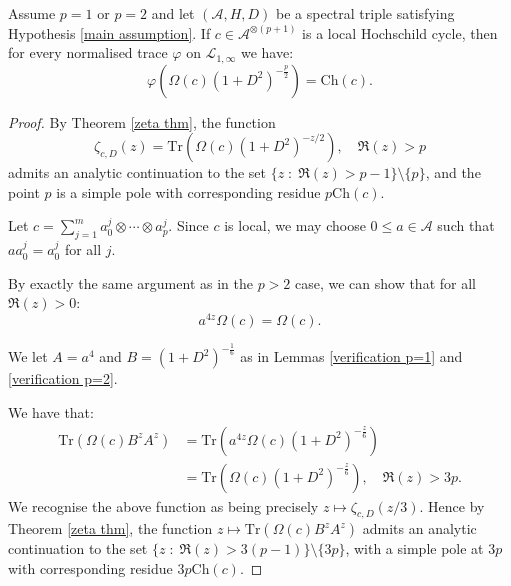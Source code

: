     \begin{thm*}
        Assume $p =1$ or $p=2$ and let $(\mathcal{A},H,D)$ be a spectral triple satisfying Hypothesis \ref{main assumption}. If $c\in\mathcal{A}^{\otimes (p+1)}$ is a local Hochschild cycle, then
        for every normalised trace $\varphi$ on $\mathcal{L}_{1,\infty}$ we have:
        \begin{equation*}
            \varphi(\Omega(c)(1+D^2)^{-\frac{p}{2}})=\mathrm{Ch}(c).
        \end{equation*}
    \end{thm*}
    \begin{proof}
        By Theorem \ref{zeta thm}, the function
        \begin{equation*}
            \zeta_{c,D}(z) = \mathrm{Tr}(\Omega(c)(1+D^2)^{-z/2}),\quad \Re(z) > p
        \end{equation*}
        admits an analytic continuation to the set $\{z\;:\;\Re(z)>p-1\}\setminus \{p\}$, and the point $p$ is a simple
        pole with corresponding residue $p\mathrm{Ch}(c)$.

        Let $c = \sum_{j=1}^m a_0^j\otimes \cdots\otimes a_p^j$. Since $c$ is local, we may choose $0 \leq a \in \mathcal{A}$ such that $aa_0^j = a_0^j$ for all $j$.
        
        By exactly the same argument as in the $p>2$ case, we can show that for all $\Re(z) > 0$:
        \begin{equation}\label{omega is still local}
            a^{4z}\Omega(c)=\Omega(c).
        \end{equation}

        We let $A=a^4$ and $B=(1+D^2)^{-\frac16}$ as in Lemmas \ref{verification p=1} and \ref{verification p=2}.
        
        We have that:
        \begin{align*}
            \mathrm{Tr}(\Omega(c)B^zA^z) &= \mathrm{Tr}(a^{4z}\Omega(c)(1+D^2)^{-\frac{z}{6}})\\
                                 &= \mathrm{Tr}(\Omega(c)(1+D^2)^{-\frac{z}{6}}),\quad \Re(z) > 3p.
        \end{align*}
        We recognise the above function as being precisely $z\mapsto \zeta_{c,D}(z/3)$.
        Hence by Theorem \ref{zeta thm}, the function $z\mapsto \mathrm{Tr}(\Omega(c)B^zA^z)$ admits an analytic continuation to the set $\{z \;:\; \Re(z) > 3(p-1)\}\setminus \{3p\}$,
        with a simple pole at $3p$ with corresponding residue $3p\mathrm{Ch}(c)$.
        

\end{proof}
